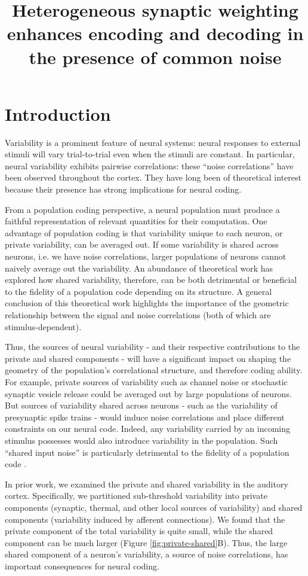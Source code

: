 \documentclass[11pt]{article}
\title{Heterogeneous synaptic weighting enhances encoding and decoding in the presence of common noise\vspace{-0.5in}}
\date{}
\begin{document}
\maketitle
\section{Introduction}

Variability is a prominent feature of neural systems: neural responses to external stimuli will vary trial-to-trial even when the stimuli are constant. In particular, neural variability exhibits pairwise correlations: these ``noise correlations'' have been observed throughout the cortex. They have long been of theoretical interest because their presence has strong implications for neural coding.
	
From a population coding perspective, a neural population must produce a faithful representation of relevant quantities for their computation. One advantage of population coding is that variability unique to each neuron, or private variability, can be averaged out. If some variability is shared across neurons, i.e. we have noise correlations, larger populations of neurons cannot naively average out the variability. An abundance of theoretical work has explored how shared variability, therefore, can be both detrimental or beneficial to the fidelity of a population code depending on its structure. A  general conclusion of this theoretical work highlights the importance of the geometric relationship between the signal and noise correlations (both of which are stimulus-dependent).
	
Thus, the sources of neural variability - and their respective contributions to the private and shared components - will have a significant impact on shaping the geometry of the population's correlational structure, and therefore coding ability. For example, private sources of variability such as channel noise or stochastic synaptic vesicle release could be averaged out by large populations of neurons. But sources of variability shared across neurons - such as the variability of presynaptic spike trains - would induce noise correlations and place different constraints on our neural code.  Indeed, any variability carried by an incoming stimulus possesses would also introduce variability in the population. Such ``shared input noise'' is particularly detrimental to the fidelity of a population code \cite{Moreno-Bote2014, Kanitscheider2015}.

In prior work, we examined the private and shared variability in the auditory cortex. Specifically, we partitioned sub-threshold variability into private components (synaptic, thermal, and other local sources of variability) and shared components (variability induced by afferent connections). We found that the private component of the total variability is quite small, while the shared component can be much larger (Figure \ref{fig:private-shared}B). Thus, the large shared component of a neuron's variability, a source of noise correlations, has important consequences for neural coding.
\end{document}
